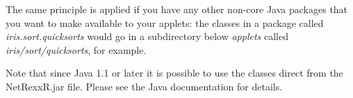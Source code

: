 The same principle is applied if you have any other non-core Java
packages that you want to make available to your applets: the classes in
a package called \emph{iris.sort.quicksorts} would go in a subdirectory
below \emph{applets} called \emph{iris/sort/quicksorts}, for example.

Note that since Java 1.1 or later it is possible to use the
classes direct from the NetRexxR.jar file. Please see the Java documentation for details.

